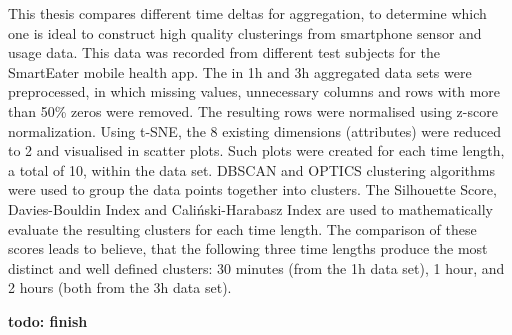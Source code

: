 
This thesis compares different time deltas for aggregation, to determine which one is ideal to construct high quality clusterings from smartphone sensor and usage data. This data was recorded from different test subjects for the SmartEater mobile health app. The in 1h and 3h aggregated data sets were preprocessed, in which missing values, unnecessary columns and rows with more than 50\% zeros were removed. The resulting rows were normalised using z-score normalization. Using t-SNE, the 8 existing dimensions (attributes) were reduced to 2 and visualised in scatter plots. Such plots were created for each time length, a total of 10, within the data set. DBSCAN and OPTICS clustering algorithms were used to group the data points together into clusters. The Silhouette Score, Davies-Bouldin Index and Caliński-Harabasz Index are used to mathematically evaluate the resulting clusters for each time length. The comparison of these scores leads to believe, that the following three time lengths produce the most distinct and well defined clusters:
30 minutes (from the 1h data set), 1 hour, and 2 hours (both from the 3h data set).






\textbf{todo: finish}
